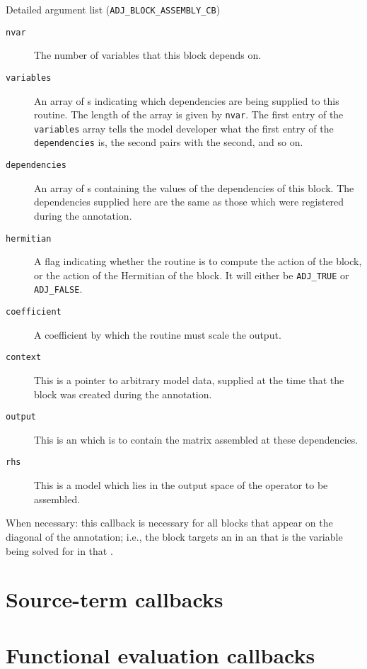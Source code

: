 \begin{boxwithtitle}{Detailed argument list (\texttt{ADJ_BLOCK_ASSEMBLY_CB})}
\begin{description}
\item[\texttt{nvar}] The number of variables that this block depends on.
\item[\texttt{variables}] An array of s indicating which dependencies are being supplied to this routine. The length of the
array is given by \texttt{nvar}. The first entry of the \texttt{variables} array
tells the model developer what the first entry of the \texttt{dependencies} is, the second pairs with the second, and so on.
\item[\texttt{dependencies}] An array of s containing the values of the dependencies of this block. The dependencies supplied
here are the same as those which were registered during the annotation.
\item[\texttt{hermitian}] A flag indicating whether the routine is to compute the action of the block, or the action of the Hermitian of the
block. It will either be \texttt{ADJ_TRUE} or \texttt{ADJ_FALSE}.
\item[\texttt{coefficient}] A coefficient by which the routine must scale the output.
\item[\texttt{context}] This is a pointer to arbitrary model data, supplied at the time that the block was created during the annotation.
\item[\texttt{output}] This is an  which is to contain the matrix assembled at these dependencies.
\item[\texttt{rhs}] This is a model  which lies in the output space of the operator to be assembled. 
\end{description}
\end{boxwithtitle}

When necessary: this callback is necessary for all blocks that appear on the diagonal of the annotation; i.e., the block
targets an  in an  that is the variable being solved for in that
.

\section{Source-term callbacks}

\section{Functional evaluation callbacks}
